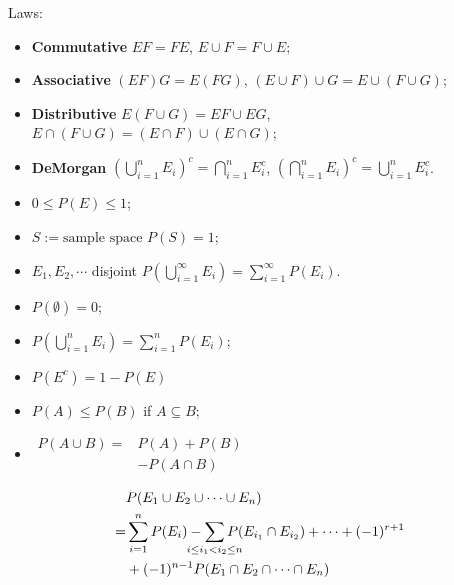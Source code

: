 Laws:
\begin{itemize}
  \item \textbf{Commutative} \(EF = FE\), \(E\cup F = F\cup E\);
  \item \textbf{Associative} \((EF)G = E(FG)\), \((E\cup F)\cup G = E\cup
    (F\cup G)\);
  \item \textbf{Distributive} \(E(F\cup G) = EF\cup EG\), \(E\cap(F\cup G) =
    (E\cap F)\cup(E\cap G)\);
  \item \textbf{DeMorgan} \((\bigcup_{i=1}^n E_i)^c = \bigcap_{i=1}^n E_i^c\),
    \((\bigcap_{i=1}^n E_i)^c = \bigcup_{i=1}^n E_i^c\).
\end{itemize}

\begin{itemize}
  \item \(0 \leq P(E)\leq 1\); 
  \item \(S:=\text{sample space}\) \tf \(P(S) = 1\); 
  \item \(E_1, E_2, \cdots\) disjoint \tf \(P\left(\bigcup_{i=1}^\infty
      E_i\right) = \sum_{i=1}^\infty P(E_i)\).
\end{itemize}

\begin{multicols}{2}
\begin{itemize}
  \item \(P(\emptyset) = 0\);
  \item \(P\left(\bigcup_{i=1}^n E_i\right) = \sum\limits_{i=1}^{n}P(E_i)\);
  \item \(P(E^c)=1-P(E)\)
  \item \(P(A) \leq P(B)\) if \(A \subseteq B\);
  \item \( \begin{aligned} P(A\cup B) =& P(A) + P(B) \\ 
           &- P(A\cap B)\end{aligned} \)
\end{itemize} 
\end{multicols}

\begin{align*}
   &P(E_1\cup E_2\cup \cdots \cup E_n) \\
  =&\sum\limits_{i=1}^{n}P(E_i)-\sum\limits_{\mathclap{i\leq i_1 < i_2 \leq n}}
  P(E_{i_1}\cap E_{i_2}) + \cdots + (-1)^{r+1} \\
   &+ (-1)^{n-1}P(E_1\cap E_2\cap \cdots \cap E_n)
\end{align*}

